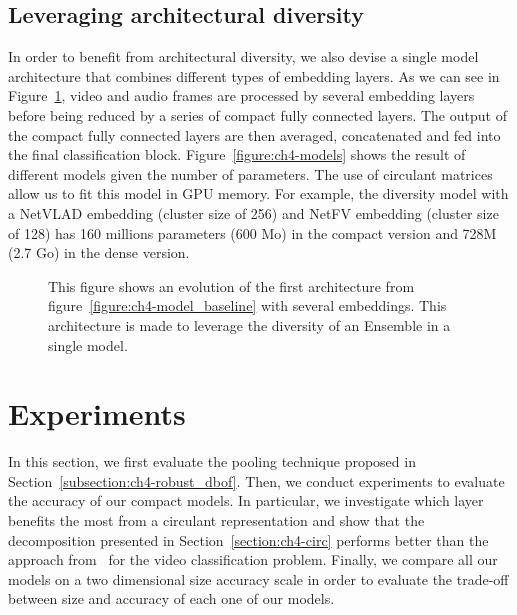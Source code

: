 \subsection{Leveraging architectural diversity}
\label{subsection:ch4-ensemble}

In order to benefit from architectural diversity, we also devise a single model architecture that combines different types of embedding layers.
As we can see in Figure~\ref{figure:ch4-diverstiy_architecture}, video and audio frames are processed by several embedding layers before being reduced by a series of compact fully connected layers.
The output of the compact fully connected layers are then averaged, concatenated and fed into the final classification block.
Figure~\ref{figure:ch4-models} shows the result of different models given the number of parameters.
The use of circulant matrices allow us to fit this model in GPU memory.
For example, the diversity model with a NetVLAD embedding (cluster size of 256) and NetFV embedding (cluster size of 128) has 160 millions parameters (600 Mo) in the compact version and 728M (2.7 Go) in the dense version. 

\begin{figure}[htb]
  \centering
  
  \caption{This figure shows an evolution of the first architecture from figure~\ref{figure:ch4-model_baseline} with several embeddings. This architecture is made to leverage the diversity of an Ensemble in a single model.}
  \label{figure:ch4-diverstiy_architecture}
\end{figure}

\section{Experiments}
\label{section:ch4-xp}

In this section, we first evaluate the pooling technique proposed in Section~\ref{subsection:ch4-robust_dbof}.
Then, we conduct experiments to evaluate the accuracy of our compact models.
In particular, we investigate which layer benefits the most from a circulant representation and show that the decomposition presented in Section~\ref{section:ch4-circ} performs better than the  approach from~\cite{cheng2015exploration} for the video classification problem.
Finally, we compare all our models on a two dimensional size \vs accuracy scale in order to evaluate the trade-off between size and accuracy of each one of our models. 


